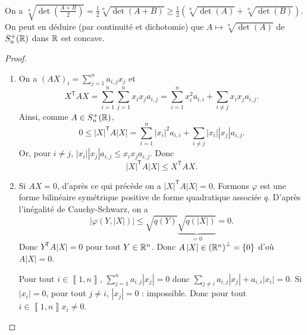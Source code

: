 \documentclass[12pt]{article}
\begin{document}
\begin{remark}
	On a $\sqrt[n]{\det\left(\frac{A+B}{2}\right)}=\frac{1}{2}\sqrt[n]{\det(A+B)}\geqslant\frac{1}{2}\left(\sqrt[n]{\det(A)}+\sqrt[n]{\det(B)}\right)$. On peut en déduire (par continuité et dichotomie) que $A\mapsto\sqrt[n]{\det(A)}$ de $S_n^{+}(\mathbb{R})$ dans $\mathbb{R}$ est concave.
\end{remark}

\begin{proof}
	\phantom{}
	\begin{enumerate}
		\item On a $\left(AX\right)_{i}=\sum_{j=1}^{n}a_{i,j}x_j$ et 
		\begin{equation}
			X^{\mathsf{T}}AX=\sum_{i=1}^{n}\sum_{j=1}^{n}x_{i}x_{j}a_{i,j}=\sum_{i=1}^{n}x_{i}^{2}a_{i,i}+\sum_{i\neq j}x_{i}x_{j}a_{i,j}.
		\end{equation}
		Ainsi, comme $A\in S_n^{+}(\mathbb{R})$, 
		\begin{equation}
			0\leqslant \left\lvert X\right\rvert^{\mathsf{T}}A\left\lvert X\right\rvert=\sum_{i=1}^{n}\left\lvert x_i\right\rvert^{2}a_{i,i}+\sum_{i\neq j}\left\lvert x_i\right\rvert\left\lvert x_j\right\rvert a_{i,j}.
		\end{equation}
		Or, pour $i\neq j$, $\left\lvert x_i\right\rvert\left\lvert x_j\right\rvert a_{i,j}\leqslant x_i x_j a_{i,j}$. Donc 
		\begin{equation}
			\left\lvert X\right\rvert^{\mathsf{T}}A\left\lvert X\right\rvert\leqslant X^{\mathsf{T}}AX.
		\end{equation}

		\item Si $AX=0$, d'après ce qui précède on a $\left\lvert X\right\rvert^{\mathsf{T}}A\left\lvert X\right\rvert=0$. Formons 
		$\varphi$ est une forme bilinéaire symétrique positive de forme quadratique associée $q$. D'après l'inégalité de Cauchy-Schwarz, on a 
		\begin{equation}
			\left\lvert\varphi(Y,\left\lvert X\right\rvert)\right\rvert\leqslant\sqrt{q(Y)}\underbrace{\sqrt{q(\left\lvert X\right\rvert)}}_{=0}=0.
		\end{equation}
		Donc $Y^{\mathsf{T}}A\left\lvert X\right\rvert=0$ pour tout $Y\in\mathbb{R}^{n}$. Donc $A\left\lvert X\right\rvert\in\left(\mathbb{R}^{n}\right)^{\perp}=\left\lbrace0\right\rbrace$ d'où $A\left\lvert X\right\rvert=0$.

		Pour tout $i\in\left\llbracket1,n\right\rrbracket$, $\sum_{j=1}^{n}a_{i,j}\left\lvert x_j\right\rvert=0$ donc $\sum_{j\neq i}a_{i,j}\left\lvert x_j\right\rvert+a_{i,i}\left\lvert x_i\right\rvert=0$. Si $\left\lvert x_i\right\rvert=0$, pour tout $j\neq i$, $\left\lvert x_j\right\rvert=0$ : impossible. Donc pour tout $i\in\left\llbracket1,n\right\rrbracket x_i\neq0$.


\end{enumerate}
\end{proof}
\end{document}
